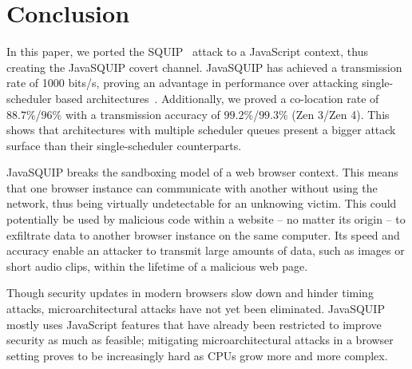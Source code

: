 \documentclass[11pt,
  titlepage=false,
]{scrreprt}
\begin{document}
\chapter{Conclusion}
\label{ch:conclusion}
In this paper, we ported the SQUIP~\cite{squip} attack to a JavaScript context, thus creating the JavaSQUIP covert channel.
JavaSQUIP has achieved a transmission rate of 1000 bits/s, proving an advantage in performance over attacking single-scheduler based architectures~\cite{Rokicki2022webport}.
Additionally, we proved a co-location rate of $88.7\%$/$96\%$ with a transmission accuracy of $99.2\%$/$99.3\%$ (Zen 3/Zen 4).
This shows that architectures with multiple scheduler queues present a bigger attack surface than their single-scheduler counterparts.

JavaSQUIP breaks the sandboxing model of a web browser context.
This means that one browser instance can communicate with another without using the network, thus being virtually undetectable for an unknowing victim.
This could potentially be used by malicious code within a website -- no matter its origin -- to exfiltrate data to another browser instance on the same computer.
Its speed and accuracy enable an attacker to transmit large amounts of data, such as images or short audio clips, within the lifetime of a malicious web page.

Though security updates in modern browsers slow down and hinder timing attacks, microarchitectural attacks have not yet been eliminated.
JavaSQUIP mostly uses JavaScript features that have already been restricted to improve security as much as feasible;
mitigating microarchitectural attacks in a browser setting proves to be increasingly hard as CPUs grow more and more complex.



\printbibliography
\end{document}
